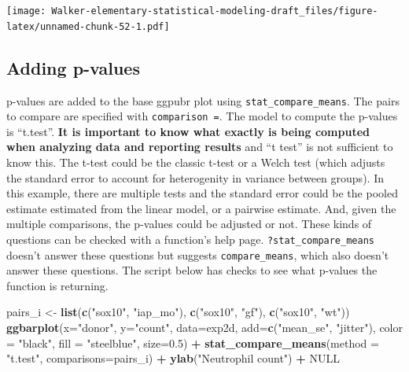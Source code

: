 \documentclass[]{book}
\newenvironment{Shaded}{\begin{snugshade}}{\end{snugshade}}
\newcommand{\KeywordTok}[1]{\textcolor[rgb]{0.13,0.29,0.53}{\textbf{#1}}}
\newcommand{\DataTypeTok}[1]{\textcolor[rgb]{0.13,0.29,0.53}{#1}}
\newcommand{\FloatTok}[1]{\textcolor[rgb]{0.00,0.00,0.81}{#1}}
\newcommand{\StringTok}[1]{\textcolor[rgb]{0.31,0.60,0.02}{#1}}
\newcommand{\OtherTok}[1]{\textcolor[rgb]{0.56,0.35,0.01}{#1}}
\newcommand{\OperatorTok}[1]{\textcolor[rgb]{0.81,0.36,0.00}{\textbf{#1}}}
\newcommand{\NormalTok}[1]{#1}
\begin{document}
\texttt{[image: Walker-elementary-statistical-modeling-draft\_files/figure-latex/unnamed-chunk-52-1.pdf]}

\subsection{Adding p-values}\label{adding-p-values}

p-values are added to the base ggpubr plot using
\texttt{stat\_compare\_means}. The pairs to compare are specified with
\texttt{comparison\ =}. The model to compute the p-values is ``t.test''.
\textbf{It is important to know what exactly is being computed when
analyzing data and reporting results} and ``t test'' is not sufficient
to know this. The t-test could be the classic t-test or a Welch test
(which adjusts the standard error to account for heterogenity in
variance between groups). In this example, there are multiple tests and
the standard error could be the pooled estimate estimated from the
linear model, or a pairwise estimate. And, given the multiple
comparisons, the p-values could be adjusted or not. These kinds of
questions can be checked with a function's help page.
\texttt{?stat\_compare\_means} doesn't answer these questions but
suggests \texttt{compare\_means}, which also doesn't answer these
questions. The script below has checks to see what p-values the function
is returning.

\begin{Shaded}
\begin{Highlighting}[]
\NormalTok{pairs_i <-}\StringTok{ }\KeywordTok{list}\NormalTok{(}\KeywordTok{c}\NormalTok{(}\StringTok{"sox10"}\NormalTok{, }\StringTok{"iap_mo"}\NormalTok{), }\KeywordTok{c}\NormalTok{(}\StringTok{"sox10"}\NormalTok{, }\StringTok{"gf"}\NormalTok{), }\KeywordTok{c}\NormalTok{(}\StringTok{"sox10"}\NormalTok{, }\StringTok{"wt"}\NormalTok{))}
\KeywordTok{ggbarplot}\NormalTok{(}\DataTypeTok{x=}\StringTok{"donor"}\NormalTok{, }
          \DataTypeTok{y=}\StringTok{"count"}\NormalTok{, }
          \DataTypeTok{data=}\NormalTok{exp2d,}
          \DataTypeTok{add=}\KeywordTok{c}\NormalTok{(}\StringTok{"mean_se"}\NormalTok{, }\StringTok{"jitter"}\NormalTok{),}
          \DataTypeTok{color =} \StringTok{"black"}\NormalTok{,}
          \DataTypeTok{fill =} \StringTok{"steelblue"}\NormalTok{,}
          \DataTypeTok{size=}\FloatTok{0.5}\NormalTok{) }\OperatorTok{+}
\StringTok{  }\KeywordTok{stat_compare_means}\NormalTok{(}\DataTypeTok{method =} \StringTok{"t.test"}\NormalTok{, }\DataTypeTok{comparisons=}\NormalTok{pairs_i) }\OperatorTok{+}
\StringTok{  }\KeywordTok{ylab}\NormalTok{(}\StringTok{"Neutrophil count"}\NormalTok{) }\OperatorTok{+}
\StringTok{  }\OtherTok{NULL}
\end{Highlighting}
\end{Shaded}
\end{document}
